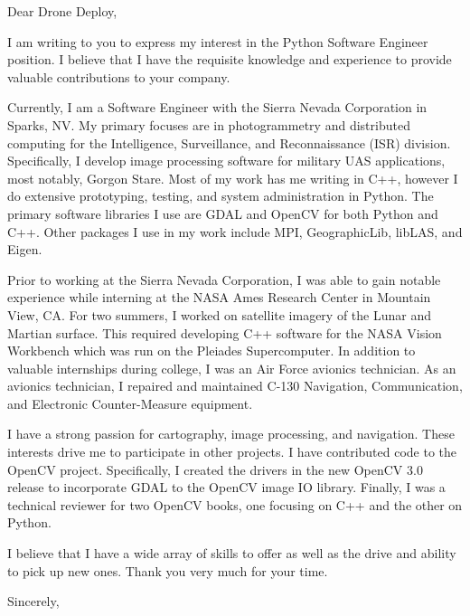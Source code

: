 \documentclass[12pt]{letter}
\begin{document}
\begin{letter}{}

\opening{Dear Drone Deploy,}


I am writing to you to express my interest in the Python Software Engineer position. I believe that I have 
the requisite knowledge and experience to provide valuable contributions to your company.


Currently, I am a Software Engineer with the Sierra Nevada Corporation in Sparks, NV. My primary focuses are in 
photogrammetry and distributed computing for the Intelligence, Surveillance, and Reconnaissance (ISR) division. 
Specifically, I develop image processing software for military UAS applications, most notably, Gorgon Stare. 
Most of my work has me writing in C++, however I do extensive prototyping, testing, and system administration in Python. 
The primary software libraries I use are GDAL and OpenCV for both Python and C++. 
Other packages I use in my work include MPI, GeographicLib, libLAS, and Eigen.


Prior to working at the Sierra Nevada Corporation, I was able to gain notable experience while interning at the NASA Ames 
Research Center in Mountain View, CA. For two summers, I worked on satellite imagery of the Lunar and Martian surface. 
This required developing C++ software for the NASA Vision Workbench which was run on the Pleiades Supercomputer. 
In addition to valuable internships during college, I was an Air Force avionics technician.   
As an avionics technician, I repaired and maintained C-130 Navigation, Communication, and Electronic Counter-Measure equipment. 


I have a strong passion for cartography, image processing, and navigation.
These interests drive me to participate in other projects. I have contributed code to the OpenCV
project. Specifically, I created the drivers in the new OpenCV 3.0 release to incorporate GDAL to the 
OpenCV image IO library. Finally, I was a technical reviewer for two OpenCV books, one focusing on C++ 
and the other on Python.


I believe that I have a wide array of skills to offer as well as the drive and ability to pick up new ones. Thank you very much for your time.


\closing{Sincerely,}
\end{letter}
\end{document}
